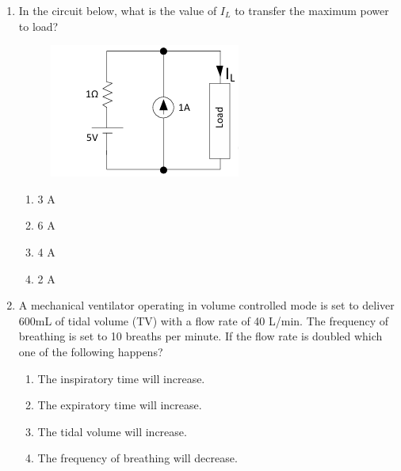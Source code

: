 \documentclass[a4paper,12pt]{exam}
\numberwithin{equation}{enumi}
\numberwithin{figure}{enumi}
\begin{document}
\begin{enumerate}
\hfill{}

\begin{enumerate}
\item fh = 8 Hz, fl = 12 Hz, fs = 12 Hz 
\item fh = 4 Hz, fl = 6 Hz, fs = 24 Hz 
\item fh = 6 Hz, fl = 4 Hz, fs = 12 Hz
\item fh = 8 Hz, fl = 12 Hz, fs = 48 Hz 
\end{enumerate}  

\item In the circuit below, what is the value of $I_L$ to transfer the maximum power to load? 

\begin{figure}[H]
\centering
\includegraphics[width=0.5\columnwidth]{figs/Q46.png}
\label{fig:Q46.png}
\end{figure}

\hfill{}

\begin{multicols}{4}
\begin{enumerate}
\item 3 A
\item 6 A
\item 4 A
\item 2 A
\end{enumerate}  
\end{multicols}

\item A mechanical ventilator operating in volume controlled mode is set to deliver 600mL of tidal volume (TV) with a flow rate of 40 L/min. The frequency of breathing is set  to 10 breaths per minute. If the flow rate is doubled which one of the following  happens? 

\hfill{}

\begin{enumerate}
\item The inspiratory time will increase.
\item The expiratory time will increase.
\item The tidal volume will increase. 
\item The frequency of breathing will decrease. 
\end{enumerate}  


\end{enumerate}
\end{document}
